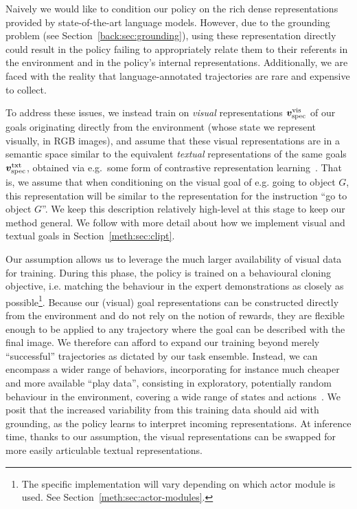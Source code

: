 \documentclass[../main.tex]{subfiles}
\begin{document}
Naively we would like to condition our policy on the rich dense representations provided by
state-of-the-art language models. However, due to the grounding problem (see Section~\ref{back:sec:grounding}), using these representation directly could result in the policy failing to appropriately relate them to their referents in the environment and in the policy's internal representations. Additionally,
we are faced with the reality that language-annotated trajectories are rare and expensive to
collect.

To address these issues, we instead train on \emph{visual} representations
$\bm v_\text{spec}^\text{vis}$ of our goals originating directly from the environment (whose
state we represent visually, in RGB images), and assume that these visual representations are in
a semantic space similar to the equivalent \emph{textual} representations of the same goals
$\bm v_\text{spec}^\text{txt}$, obtained via e.g.\ some form of contrastive representation
learning~\citep{chen_simple_2020, le-khac_contrastive_2020}. That is, we assume that when
conditioning on the visual goal of e.g. going to object $G$, this representation will be similar to
the representation for the instruction ``go to object $G$''. We keep this description relatively
high-level at this stage to keep our method general. We follow with more detail about how we
implement visual and textual goals in Section~\ref{meth:sec:clipt}.

Our assumption allows us to leverage the much larger availability of visual data for training.
During this phase, the policy is trained on a behavioural cloning objective, i.e. matching the
behaviour in the expert demonstrations as closely as possible\footnote{The specific implementation
	will vary depending on which actor module is used. See Section~\ref{meth:sec:actor-modules}.}.
Because our (visual) goal representations can be constructed directly from the environment and do
not rely on the notion of rewards, they are flexible enough to be applied to any trajectory where the goal can be described with the final image. We
therefore can afford to expand our training beyond merely ``successful'' trajectories as dictated by
our task ensemble. Instead, we can encompass a wider range of behaviors, incorporating for instance
much cheaper and more available ``play data'', consisting in exploratory, potentially random
behaviour in the environment, covering a wide range of states and actions~\citep{lynch_learning_2020}. We posit that the increased variability from this training data should
aid with grounding, as the policy learns to interpret incoming representations. At inference time,
thanks to our assumption, the visual representations can be swapped for more easily articulable
textual representations.
\end{document}
